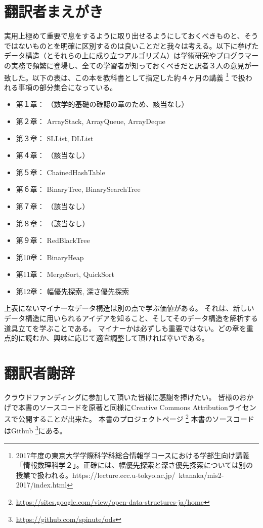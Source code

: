 \chapter*{翻訳者まえがき}

実用上極めて重要で息をするように取り出せるようにしておくべきものと、そうではないものとを明確に区別するのは良いことだと我々は考える。以下に挙げたデータ構造（とそれらの上に成り立つアルゴリズム）は学術研究やプログラマーの実務で頻繁に登場し、全ての学習者が知っておくべきだと訳者３人の意見が一致した。以下の表は、この本を教科書として指定した約４ヶ月の講義
\footnote{2017年度の東京大学学際科学科総合情報学コースにおける学部生向け講義「情報数理科学２」。正確には、幅優先探索と深さ優先探索については別の授業で扱われる。https://lecture.ecc.u-tokyo.ac.jp/~ktanaka/mis2-2017/index.html}
で扱われる事項の部分集合になっている。


\begin{itemize}
  \item 第１章： （数学的基礎の確認の章のため、該当なし）
  \item 第２章： ArrayStack, ArrayQueue, ArrayDeque
  \item 第３章： SLList, DLList
  \item 第４章： （該当なし）
  \item 第５章： ChainedHashTable
  \item 第６章： BinaryTree, BinarySearchTree
  \item 第７章： （該当なし）
  \item 第８章： （該当なし）
  \item 第９章： RedBlackTree
  \item 第10章： BinaryHeap
  \item 第11章： MergeSort, QuickSort
  \item 第12章： 幅優先探索, 深さ優先探索
\end{itemize}

上表にないマイナーなデータ構造は別の点で学ぶ価値がある。
それは、新しいデータ構造に用いられるアイデアを知ること、そしてそのデータ構造を解析する道具立てを学ぶことである。
マイナーかは必ずしも重要ではない。どの章を重点的に読むか、興味に応じて適宜調整して頂ければ幸いである。


\chapter*{翻訳者謝辞}
クラウドファンディングに参加して頂いた皆様に感謝を捧げたい。
皆様のおかげで本書のソースコードを原著と同様にCreative Commons Attributionライセンスで公開することが出来た。
本書のプロジェクトページ \footnote {\url{https://sites.google.com/view/open-data-structures-ja/home}}
本書のソースコードはGithub \footnote {\url{https://github.com/spinute/ods}}にある。
